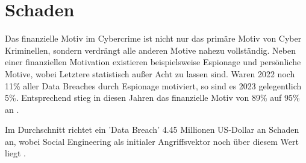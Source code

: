 







\section{Schaden}

Das finanzielle Motiv im Cybercrime ist nicht nur das primäre Motiv von Cyber Kriminellen, sondern verdrängt alle anderen Motive nahezu vollständig.
Neben einer finanziellen Motivation existieren beispielsweise Espionage und persönliche Motive, wobei Letztere statistisch außer Acht zu lassen sind.
Waren 2022 noch 11\% aller Data Breaches durch Espionage motiviert, so sind es 2023 gelegentlich 5\%.
Entsprechend stieg in diesen Jahren das finanzielle Motiv von 89\% auf 95\% an .

Im Durchschnitt richtet ein 'Data Breach' 4.45 Millionen US-Dollar an Schaden an, wobei Social Engineering als initialer Angriffsvektor noch
über diesem Wert liegt .


